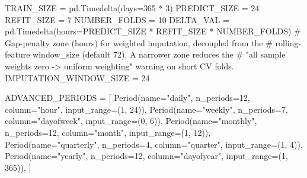 \documentclass[
  english,
  letterpaper,
]{scrbook}
\newenvironment{Shaded}{\begin{snugshade}}{\end{snugshade}}
\newcommand{\CommentTok}[1]{\textcolor[rgb]{0.37,0.37,0.37}{#1}}
\newcommand{\DecValTok}[1]{\textcolor[rgb]{0.68,0.00,0.00}{#1}}
\newcommand{\NormalTok}[1]{\textcolor[rgb]{0.00,0.23,0.31}{#1}}
\newcommand{\OperatorTok}[1]{\textcolor[rgb]{0.37,0.37,0.37}{#1}}
\newcommand{\StringTok}[1]{\textcolor[rgb]{0.13,0.47,0.30}{#1}}
\begin{document}
\protect{}\label{team4-config}
\begin{Shaded}
\begin{Highlighting}[]
\NormalTok{TRAIN\_SIZE }\OperatorTok{=}\NormalTok{ pd.Timedelta(days}\OperatorTok{=}\DecValTok{365} \OperatorTok{*} \DecValTok{3}\NormalTok{)}
\NormalTok{PREDICT\_SIZE }\OperatorTok{=} \DecValTok{24}
\NormalTok{REFIT\_SIZE }\OperatorTok{=} \DecValTok{7}
\NormalTok{NUMBER\_FOLDS }\OperatorTok{=} \DecValTok{10}
\NormalTok{DELTA\_VAL }\OperatorTok{=}\NormalTok{ pd.Timedelta(hours}\OperatorTok{=}\NormalTok{PREDICT\_SIZE }\OperatorTok{*}\NormalTok{ REFIT\_SIZE }\OperatorTok{*}\NormalTok{ NUMBER\_FOLDS)}
\CommentTok{\# Gap{-}penalty zone (hours) for weighted imputation, decoupled from the}
\CommentTok{\# rolling{-}feature \textasciigrave{}window\_size\textasciigrave{} (default 72). A narrower zone reduces the}
\CommentTok{\# "all sample weights zero {-}\textgreater{} uniform weighting" warning on short CV folds.}
\NormalTok{IMPUTATION\_WINDOW\_SIZE }\OperatorTok{=} \DecValTok{24}

\NormalTok{ADVANCED\_PERIODS }\OperatorTok{=}\NormalTok{ [}
\NormalTok{    Period(name}\OperatorTok{=}\StringTok{"daily"}\NormalTok{,     n\_periods}\OperatorTok{=}\DecValTok{12}\NormalTok{, column}\OperatorTok{=}\StringTok{"hour"}\NormalTok{,      input\_range}\OperatorTok{=}\NormalTok{(}\DecValTok{1}\NormalTok{, }\DecValTok{24}\NormalTok{)),}
\NormalTok{    Period(name}\OperatorTok{=}\StringTok{"weekly"}\NormalTok{,    n\_periods}\OperatorTok{=}\DecValTok{7}\NormalTok{,  column}\OperatorTok{=}\StringTok{"dayofweek"}\NormalTok{, input\_range}\OperatorTok{=}\NormalTok{(}\DecValTok{0}\NormalTok{, }\DecValTok{6}\NormalTok{)),}
\NormalTok{    Period(name}\OperatorTok{=}\StringTok{"monthly"}\NormalTok{,   n\_periods}\OperatorTok{=}\DecValTok{12}\NormalTok{, column}\OperatorTok{=}\StringTok{"month"}\NormalTok{,     input\_range}\OperatorTok{=}\NormalTok{(}\DecValTok{1}\NormalTok{, }\DecValTok{12}\NormalTok{)),}
\NormalTok{    Period(name}\OperatorTok{=}\StringTok{"quarterly"}\NormalTok{, n\_periods}\OperatorTok{=}\DecValTok{4}\NormalTok{,  column}\OperatorTok{=}\StringTok{"quarter"}\NormalTok{,   input\_range}\OperatorTok{=}\NormalTok{(}\DecValTok{1}\NormalTok{, }\DecValTok{4}\NormalTok{)),}
\NormalTok{    Period(name}\OperatorTok{=}\StringTok{"yearly"}\NormalTok{,    n\_periods}\OperatorTok{=}\DecValTok{12}\NormalTok{, column}\OperatorTok{=}\StringTok{"dayofyear"}\NormalTok{, input\_range}\OperatorTok{=}\NormalTok{(}\DecValTok{1}\NormalTok{, }\DecValTok{365}\NormalTok{)),}
\NormalTok{]}


\end{Highlighting}
\end{Shaded}
\end{document}

